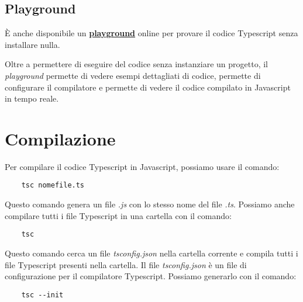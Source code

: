 \documentclass[12pt]{article}
\begin{document}
\subsection{Playground}
È anche disponibile un \textbf{\href{https://www.typescriptlang.org/play}{playground}} online per provare il
codice Typescript senza installare nulla.

Oltre a permettere di eseguire del codice senza instanziare
un progetto, il \textit{playground} permette di vedere
esempi dettagliati di codice, permette di configurare
il compilatore e permette di vedere il codice compilato in Javascript
in tempo reale.

\section{Compilazione}
Per compilare il codice Typescript in Javascript, possiamo usare il comando:
\begin{highlight}
    \begin{verbatim}
    tsc nomefile.ts
    \end{verbatim}
\end{highlight}
Questo comando genera un file \textit{.js} con lo stesso nome del file \textit{.ts}.
Possiamo anche compilare tutti i file Typescript in una cartella
con il comando:
\begin{highlight}
    \begin{verbatim}
    tsc
    \end{verbatim}
\end{highlight}
Questo comando cerca un file \textit{tsconfig.json} nella cartella corrente e compila
tutti i file Typescript presenti nella cartella.
Il file \textit{tsconfig.json} è un file di configurazione per il compilatore Typescript.
Possiamo generarlo con il comando:
\begin{highlight}
    \begin{verbatim}
    tsc --init
    \end{verbatim}
\end{highlight}
\end{document}
